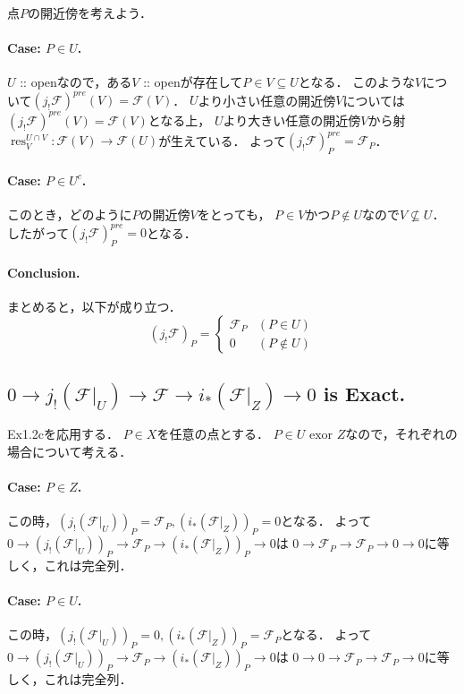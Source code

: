 \documentclass[a4paper]{jsarticle}
\newcommand{\shF}{\mathcal{F}}
\newcommand{\res}{\operatorname{res}}
\begin{document}
    点$P$の開近傍を考えよう．

    \paragraph{Case: $P \in U$.}
    $U$ :: openなので，ある$V$ :: openが存在して$P \in V \subseteq U$となる．
    このような$V$について$(j_! \shF)^{pre}(V)=\shF(V)$．
    $U$より小さい任意の開近傍$V$については$(j_! \shF)^{pre}(V)=\shF(V)$となる上，
    $U$より大きい任意の開近傍$V$から射$\res_V^{U \cap V}: \shF(V) \to \shF(U)$が生えている．
    よって$(j_! \shF)^{pre}_P=\shF_P$．

    \paragraph{Case: $P \in U^c$.}
    このとき，どのように$P$の開近傍$V$をとっても，
    $P \in V$かつ$P \not \in U$なので$V \not \subseteq U$．
    したがって$(j_! \shF)^{pre}_P=0$となる．

    \paragraph{Conclusion.}
    まとめると，以下が成り立つ．
    \[
        (j_! \shF)_P=
        \begin{cases}{}
            \shF_P & (P \in U) \\
            0 & (P \not \in U)
        \end{cases}
    \]

    \subsection{$0 \to j_!(\shF|_U) \to \shF \to i_*(\shF|_Z) \to 0$ is Exact.}
    Ex1.2cを応用する．
    $P \in X$を任意の点とする．
    $P \in U \text{ exor } Z$なので，それぞれの場合について考える．

    \paragraph{Case: $P \in Z$.}
    この時，$(j_!(\shF|_U))_P=\shF_P, (i_*(\shF|_Z))_P=0$となる．
    よって$0 \to (j_!(\shF|_U))_P \to \shF_P \to (i_*(\shF|_Z))_P \to 0$は
    $0 \to \shF_P \to \shF_P \to 0 \to 0$に等しく，これは完全列．

    \paragraph{Case: $P \in U$.}
    この時，$(j_!(\shF|_U))_P=0, (i_*(\shF|_Z))_P=\shF_P$となる．
    よって$0 \to (j_!(\shF|_U))_P \to \shF_P \to (i_*(\shF|_Z))_P \to 0$は
    $0 \to 0 \to \shF_P \to \shF_P \to 0$に等しく，これは完全列．
\end{document}
